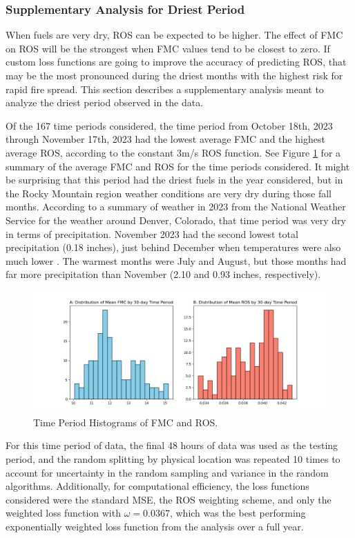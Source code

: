 \documentclass[11pt]{article}%
\begin{document}
\subsubsection{Supplementary Analysis for Driest Period}
\hfill

When fuels are very dry, ROS can be expected to be higher. The effect of FMC on ROS will be the strongest when FMC values tend to be closest to zero. If custom loss functions are going to improve the accuracy of predicting ROS, that may be the most pronounced during the driest months with the highest risk for rapid fire spread. This section describes a supplementary analysis meant to analyze the driest period observed in the data. 

Of the 167 time periods considered, the time period from October 18th, 2023 through November 17th, 2023 had the lowest average FMC and the highest average ROS, according to the constant 3m/s ROS function. See Figure \ref{fig:dry} for a summary of the average FMC and ROS for the time periods considered. It might be surprising that this period had the driest fuels in the year considered, but in the Rocky Mountain region weather conditions are very dry during those fall months. According to a summary of weather in 2023 from the National Weather Service for the weather around Denver, Colorado, that time period was very dry in terms of precipitation. November 2023 had the second lowest total precipitation (0.18 inches), just behind December when temperatures were also much lower \citep{NWS-2023-DAC}. The warmest months were July and August, but those months had far more precipitation than November  (2.10 and 0.93 inches, respectively). 

\begin{figure}[ht]
    \centering
    \includegraphics[width=1\textwidth]{images/dry.png}
    \caption{Time Period Histograms of FMC and ROS.}
    \label{fig:dry}
\end{figure}

For this time period of data, the final 48 hours of data was used as the testing period, and the random splitting by physical location was repeated 10 times to account for uncertainty in the random sampling and variance in the random algorithms. Additionally, for computational efficiency, the loss functions considered were the standard MSE, the ROS weighting scheme, and only the weighted loss function with $\omega = 0.0367$, which was the best performing exponentially weighted loss function from the analysis over a full year.
\end{document}
